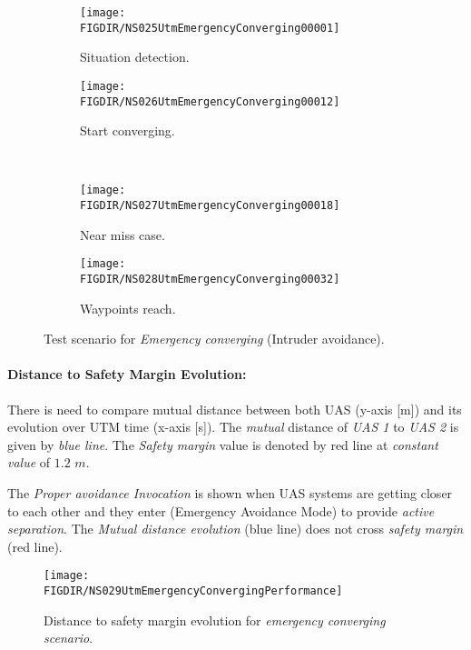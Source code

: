 \begin{figure}[H]
    \centering
    \begin{subfigure}{0.48\textwidth}
    	\centering
        \texttt{[image: \\FIGDIR/NS025UtmEmergencyConverging00001]}
        \caption{Situation detection.}
        \label{fig:emergencyConvergingSituationDetection}
    \end{subfigure}
    \begin{subfigure}{0.48\textwidth}
    	\centering
        \texttt{[image: \\FIGDIR/NS026UtmEmergencyConverging00012]} 
        \caption{Start converging.}
        \label{fig:emergencyConvergingStart}
    \end{subfigure}
    \\
    \begin{subfigure}{0.48\textwidth}
    	\centering
        \texttt{[image: \\FIGDIR/NS027UtmEmergencyConverging00018]} 
        \caption{Near miss case.}
        \label{fig:emergencyConvergingEnd}
    \end{subfigure}
    \begin{subfigure}{0.48\textwidth}
    	\centering
        \texttt{[image: \\FIGDIR/NS028UtmEmergencyConverging00032]} 
        \caption{Waypoints reach.}
        \label{fig:emergencyConvergingWaypointReach}
    \end{subfigure}
    \caption{Test scenario for \emph{Emergency converging} (Intruder avoidance). }
    \label{fig:testCaseEmergencyConverging}
\end{figure}



\newpage
\paragraph{Distance to Safety Margin Evolution:} There is need to compare mutual distance between both UAS (y-axis [m]) and its evolution over UTM time (x-axis [s]). The \emph{mutual} distance of \emph{UAS 1} to \emph{UAS 2} is given by \emph{blue line}. The \emph{Safety margin} value is denoted by red line at \emph{constant value} of $1.2$ $m$.

The \emph{Proper avoidance Invocation} is shown when UAS systems are getting closer to each other and they enter (Emergency Avoidance Mode) to provide \emph{active separation}. The \emph{Mutual distance evolution} (blue line) does not cross \emph{safety margin} (red line).

\begin{figure}[H]
    \centering
    \texttt{[image: \\FIGDIR/NS029UtmEmergencyConvergingPerformance]} 
    \caption{Distance to safety margin evolution for \emph{emergency converging scenario}.}
    \label{fig:testCaseEmergencyConvergingAvoidancePerformance}
\end{figure}


